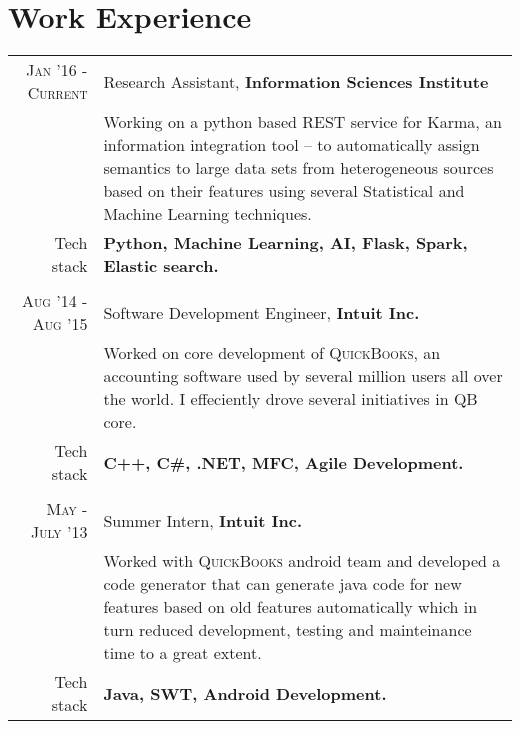 \documentclass{article} %
\begin{document}
\section{Work Experience}
\renewcommand{\arraystretch}{0.85}%
\begin{tabular}{r|p{13cm}}
\textsc{Jan '16 - Current} & Research Assistant, \textbf{Information Sciences Institute} \\
& \small{Working on a python based REST service for Karma, an information integration tool – to automatically assign semantics to large data sets from heterogeneous sources based on their features using several Statistical and Machine Learning techniques.}\\
\small{Tech stack} &\footnotesize{\textbf{Python, Machine Learning, AI, Flask, Spark, Elastic search.}} \\
\multicolumn{2}{c}{} \\


\textsc{Aug '14 - Aug '15} & Software Development Engineer, \textbf{Intuit Inc.} \\
& \small{Worked on core development of \textsc{QuickBooks}, an accounting software used by several million users all over the world. I effeciently drove several initiatives in QB core.}\\
\small{Tech stack} &\footnotesize{\textbf{C++, C\#, .NET, MFC, Agile Development.}} \\
\multicolumn{2}{c}{} \\

\textsc{May - July '13} & Summer Intern, \textbf{Intuit Inc.}\\ 
& \small{Worked with \textsc{QuickBooks} android  team and developed a code generator that can generate java code for new features based on old features automatically which in turn reduced development, testing and mainteinance time to a great extent.}\\
\small{Tech stack} &\footnotesize{\textbf{Java, SWT, Android Development.}}\\




\end{tabular}
\end{document}

